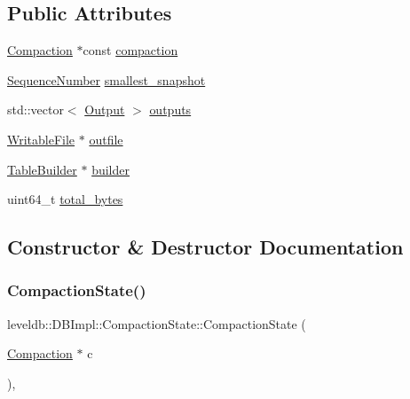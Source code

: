 \subsection*{Public Attributes}
\begin{DoxyCompactItemize}
\item 
\mbox{\hyperlink{classleveldb_1_1_compaction}{Compaction}} $\ast$const \mbox{\hyperlink{structleveldb_1_1_d_b_impl_1_1_compaction_state_a6b92e9f2249d5977b4801bdf47afed28}{compaction}}
\item 
\mbox{\hyperlink{namespaceleveldb_a5481ededd221c36d652c371249f869fa}{Sequence\+Number}} \mbox{\hyperlink{structleveldb_1_1_d_b_impl_1_1_compaction_state_a725f0984b8372c51691d72f66672dc89}{smallest\+\_\+snapshot}}
\item 
std\+::vector$<$ \mbox{\hyperlink{structleveldb_1_1_d_b_impl_1_1_compaction_state_1_1_output}{Output}} $>$ \mbox{\hyperlink{structleveldb_1_1_d_b_impl_1_1_compaction_state_acce338739aafdfa40083ae3d5aacf24a}{outputs}}
\item 
\mbox{\hyperlink{classleveldb_1_1_writable_file}{Writable\+File}} $\ast$ \mbox{\hyperlink{structleveldb_1_1_d_b_impl_1_1_compaction_state_a4c8e3de65efc30fdf33197d544a466f9}{outfile}}
\item 
\mbox{\hyperlink{classleveldb_1_1_table_builder}{Table\+Builder}} $\ast$ \mbox{\hyperlink{structleveldb_1_1_d_b_impl_1_1_compaction_state_a5335b9d45bc03378219e3fbc366fce21}{builder}}
\item 
uint64\+\_\+t \mbox{\hyperlink{structleveldb_1_1_d_b_impl_1_1_compaction_state_a21aa7304978dffc6841c4c11761f4b71}{total\+\_\+bytes}}
\end{DoxyCompactItemize}


\subsection{Constructor \& Destructor Documentation}
\mbox{\label{structleveldb_1_1_d_b_impl_1_1_compaction_state_a3f66a31afd7f73ef5021337d1ec626b6}} 
\subsubsection{\texorpdfstring{CompactionState()}{CompactionState()}}
{\footnotesize\ttfamily leveldb\+::\+D\+B\+Impl\+::\+Compaction\+State\+::\+Compaction\+State (\begin{DoxyParamCaption}\item[{\mbox{\hyperlink{classleveldb_1_1_compaction}{Compaction}} $\ast$}]{c }\end{DoxyParamCaption})\hspace{0.3cm}{\ttfamily [inline]}, {\ttfamily [explicit]}}



